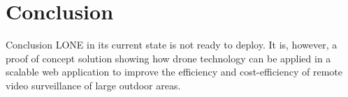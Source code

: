 \section{Conclusion}
\begin{frame}{Conclusion}
LONE in its current state is not ready to deploy. It is, however, a proof of concept solution showing how drone technology can be applied in a scalable web application to improve the efficiency and cost-efficiency of remote video surveillance of large outdoor areas.
\end{frame}